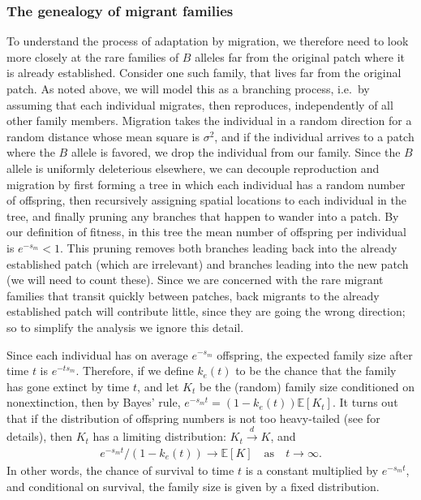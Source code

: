 \documentclass{article}
\newcommand{\citet}[1]{\cite{#1}}
\newcommand{\E}{\mathbb{E}}
\newcommand{\dconv}{\xrightarrow{d}}
\begin{document}
\subsubsection{The genealogy of migrant families}
\label{ss:migrant_math}

To understand the process of adaptation by migration,
we therefore need to look more closely at the rare families of $B$ alleles 
far from the original patch where it is already established.
Consider one such family,
that lives far from the original patch.
As noted above, we will model this as a branching process,
i.e.\ by assuming that each individual
migrates, then reproduces, independently of all other family members.
Migration takes the individual in a random direction
for a random distance whose mean square is $\sigma^2$,
and if the individual arrives to a patch where the $B$ allele is favored, 
we drop the individual from our family.
Since the $B$ allele is uniformly deleterious elsewhere,
we can decouple reproduction and migration
by first forming a tree in which each individual has a random number of offspring,
then recursively assigning spatial locations to each individual in the tree,
and finally pruning any branches that happen to wander into a patch.
By our definition of fitness, 
in this tree the mean number of offspring per individual is $e^{-s_m} < 1$.
This pruning removes both branches leading back into the already established patch (which are irrelevant)
and branches leading into the new patch (we will need to count these).
Since we are concerned with the rare migrant families that transit quickly between patches, 
back migrants to the already established patch will contribute little, since they are going the wrong direction;
so to simplify the analysis we ignore this detail.  %

Since each individual has on average $e^{-s_m}$ offspring,
the expected family size after time $t$ is $e^{- t s_m}$.
Therefore, if we define $k_e(t)$ to be the chance that the family
has gone extinct by time $t$, 
and let $K_t$ be the (random) family size conditioned on nonextinction,
then by Bayes' rule, $e^{-s_m t} = (1-k_e(t))\E[K_t]$.
It turns out that if the distribution of offspring numbers is not too heavy-tailed 
(see \citet{jagers1975branching} for details),
then $K_t$ has a limiting distribution: $K_t \dconv K$,
and 
\begin{align} \label{eqn:EK_limit}
    e^{-s_m t}/(1-k_e(t)) \to \E[K] \quad \text{as} \quad t \to \infty .
\end{align}
In other words, the chance of survival to time $t$ is a constant multiplied by $e^{-s_m t}$,
and conditional on survival, the family size is given by a fixed distribution.
\end{document}
